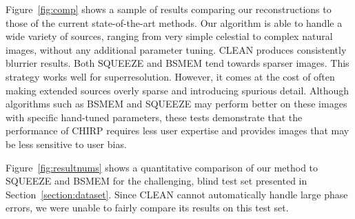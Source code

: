 Figure~\ref{fig:comp} shows a sample of results comparing our reconstructions to those of the current state-of-the-art methods. Our algorithm is able to handle a wide variety of sources, ranging from very simple celestial to complex natural images, without any additional parameter tuning. 
CLEAN produces consistently blurrier results. %
Both SQUEEZE and BSMEM tend towards sparser images. This strategy works well for superresolution.
However, it comes at the cost of often making extended sources overly sparse and introducing spurious detail. 
Although algorithms such as BSMEM and SQUEEZE may perform better on these images with specific hand-tuned parameters, these tests demonstrate that the performance of CHIRP requires less user expertise and provides images that may be less sensitive to user bias.

Figure~\ref{fig:resultnums} shows a quantitative comparison of our method to SQUEEZE and BSMEM for the challenging, blind test set presented in Section~\ref{section:dataset}. 
Since CLEAN cannot automatically handle large phase errors, we were unable to fairly compare its results on this test set. %



